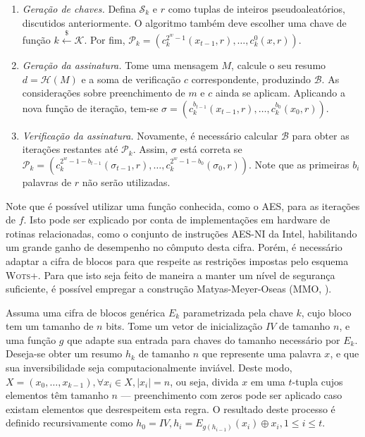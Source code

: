 \documentclass{article}
\newcommand{\pk}{$\mathcal{P}_k$}
\newcommand{\sk}{$\mathcal{S}_k$}
\begin{document}
\begin{enumerate}

    \item[] \emph{Geração de chaves.} Defina \sk{} e $r$ como tuplas de inteiros pseudoaleatórios, discutidos anteriormente. O algoritmo também deve escolher uma chave de função $k \stackrel{\$}\longleftarrow \mathcal{K}$. Por fim, $\text{\pk{}} = (c^{2^w-1}_{k}(x_{t-1}, r), \dots, c^{0}_{k}(x, r))$.
    
    \item[] \emph{Geração da assinatura.} Tome uma mensagem $M$, calcule o seu resumo $d = \mathcal{H}(M)$ e a soma de verificação $c$ correspondente, produzindo $\mathcal{B}$. As considerações sobre preenchimento de $m$ e $c$ ainda se aplicam. Aplicando a nova função de iteração, tem-se $\sigma = (c^{b_{t - 1}}_{k}(x_{t-1}, r), \dots, c^{b_{0}}_{k}(x_{0}, r))$.
    
    \item[] \emph{Verificação da assinatura.} Novamente, é necessário calcular $\mathcal{B}$ para obter as iterações restantes até \pk{}. Assim, $\sigma$ está correta se $\text{\pk{}} = (c^{2^{w} - 1 - b_{t - 1}}_{k}(\sigma_{t-1}, r), \dots, c^{2^{w} - 1 - b_{0}}_{k}(\sigma_{0}, r))$. Note que as primeiras $b_i$ palavras de $r$ não serão utilizadas.

\end{enumerate}

Note que é possível utilizar uma função conhecida, como o AES, para as iterações de $f$. Isto pode ser explicado por conta de implementações em hardware de rotinas relacionadas, como o conjunto de instruções AES-NI da Intel, habilitando um grande ganho de desempenho no cômputo desta cifra. Porém, é necessário adaptar a cifra de blocos para que respeite as restrições impostas pelo esquema \textsc{Wots+}. Para que isto seja feito de maneira a manter um nível de segurança suficiente, é possível empregar a construção Matyas-Meyer-Oseas (MMO, \cite[9.41]{Menezes:1996:HAC:548089}).

Assuma uma cifra de blocos genérica $E_{k}$ parametrizada pela chave $k$, cujo bloco tem um tamanho de $n$ bits. Tome um vetor de inicialização $IV$ de tamanho $n$, e uma função $g$ que adapte sua entrada para chaves do tamanho necessário por $E_{k}$. Deseja-se obter um resumo $h_k$ de tamanho $n$ que represente uma palavra $x$, e que sua inversibilidade seja computacionalmente inviável. Deste modo, $X = (x_0, \dots, x_{k - 1}), \forall x_i \in X, \vert x_i \vert = n$, ou seja, divida $x$ em uma $t$-tupla cujos elementos têm tamanho $n$ --- preenchimento com zeros pode ser aplicado caso existam elementos que desrespeitem esta regra. O resultado deste processo é definido recursivamente como $h_0 = IV, h_i = E_{g(h_{i-1})}(x_i) \oplus x_i, 1 \leq i \leq t$.
\end{document}
